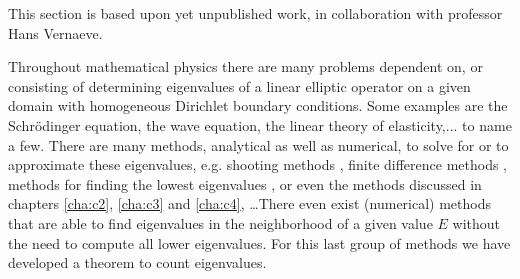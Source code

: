This section is based upon yet unpublished work, in collaboration with professor Hans Vernaeve.

Throughout mathematical physics there are many problems dependent on, or consisting of determining eigenvalues of a linear elliptic operator on a given domain with homogeneous Dirichlet boundary conditions. Some examples are the Schrödinger equation, the wave equation, the linear theory of elasticity,... to name a few. There are many methods, analytical as well as numerical, to solve for or to approximate these eigenvalues, e.g. shooting methods \cite{ixaru_numerical_1984,ixaru_new_2010}, finite difference methods \cite{wang_new_2009}, methods for finding the lowest eigenvalues \cite{braun_efficient_1996}, or even the methods discussed in chapters \ref{cha:c2}, \ref{cha:c3} and \ref{cha:c4}, \dots There even exist (numerical) methods that are able to find eigenvalues in the neighborhood of a given value $E$ without the need to compute all lower eigenvalues. For this last group of methods we have developed a theorem to count eigenvalues.

